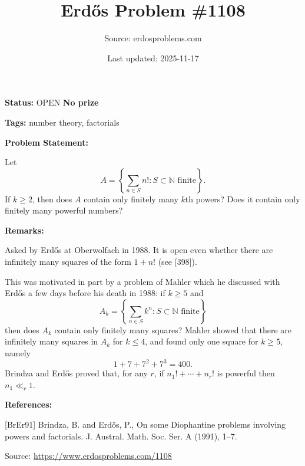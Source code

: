 \documentclass{article}
\title{Erd\H{o}s Problem \#1108}
\date{Last updated: 2025-11-17}
\author{Source: erdosproblems.com}
\begin{document}
\maketitle

\noindent\textbf{Status:} OPEN \quad \textbf{No prize}

\noindent\textbf{Tags:} number theory, factorials

\medskip
\noindent\textbf{Problem Statement:}

Let\[A = \left\{ \sum_{n\in S}n! : S\subset \mathbb{N}\textrm{ finite}\right\}.\]If $k\geq 2$, then does $A$ contain only finitely many $k$th powers? Does it contain only finitely many powerful numbers?

\bigskip
\noindent\textbf{Remarks:}

Asked by Erd\H{o}s at Oberwolfach in 1988. It is open even whether there are infinitely many squares of the form $1+n!$ (see [398]).

This was motivated in part by a problem of Mahler which he discussed with Erd\H{o}s a few days before his death in 1988: if $k\geq 5$ and\[A_k= \left\{ \sum_{n\in S}k^n : S\subset \mathbb{N}\textrm{ finite}\right\}\]then does $A_k$ contain only finitely many squares? Mahler showed that there are infinitely many squares in $A_k$ for $k\leq 4$, and found only one square for $k\geq 5$, namely\[1+7+7^2+7^3=400.\]Brindza and Erd\H{o}s \cite{BrEr91} proved that, for any $r$, if $n_1!+\cdots+n_r!$ is powerful then $n_1\ll_r 1$.

\bigskip
\noindent\textbf{References:}

[BrEr91] Brindza, B. and Erd\H{o}s, P., On some {D}iophantine problems involving powers and
factorials. J. Austral. Math. Soc. Ser. A (1991), 1--7.

\bigskip
\noindent\small{Source: \url{https://www.erdosproblems.com/1108}}
\end{document}
